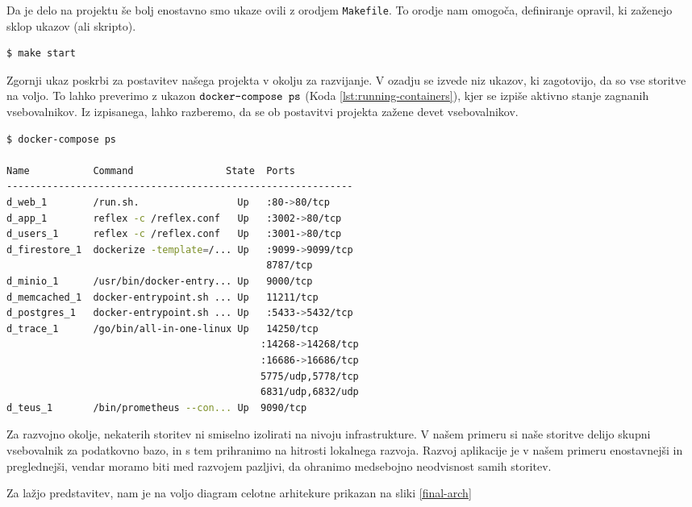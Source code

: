 \documentclass[a4paper, 12pt]{book}
\begin{document}
Da je delo na projektu še bolj enostavno smo ukaze ovili z orodjem \verb=Makefile=. To orodje nam omogoča, definiranje opravil, ki zaženejo sklop ukazov (ali skripto). 

\begin{lstlisting}[language=bash,style=mystyle]
$ make start
\end{lstlisting}

Zgornji ukaz poskrbi za postavitev našega projekta v okolju za razvijanje. V ozadju se izvede niz ukazov, ki zagotovijo, da so vse storitve na voljo. To lahko preverimo z ukazon $\verb=docker-compose ps=$ (Koda \ref{lst:running-containers}), kjer se izpiše aktivno stanje zagnanih vsebovalnikov. Iz izpisanega, lahko razberemo, da se ob postavitvi projekta zažene devet vsebovalnikov.  

\begin{lstlisting}[language=bash,style=mystyle,caption={Prikaz zagnanih vsebovalnikov},label=lst:running-containers]
$ docker-compose ps

Name           Command                State  Ports
------------------------------------------------------------
d_web_1        /run.sh.                 Up   :80->80/tcp
d_app_1        reflex -c /reflex.conf   Up   :3002->80/tcp
d_users_1      reflex -c /reflex.conf   Up   :3001->80/tcp 
d_firestore_1  dockerize -template=/... Up   :9099->9099/tcp             
                                             8787/tcp
d_minio_1      /usr/bin/docker-entry... Up   9000/tcp     
d_memcached_1  docker-entrypoint.sh ... Up   11211/tcp     
d_postgres_1   docker-entrypoint.sh ... Up   :5433->5432/tcp       
d_trace_1      /go/bin/all-in-one-linux Up   14250/tcp 
                                            :14268->14268/tcp
                                            :16686->16686/tcp
                                            5775/udp,5778/tcp 
                                            6831/udp,6832/udp   
d_teus_1       /bin/prometheus --con... Up  9090/tcp     
\end{lstlisting}

Za razvojno okolje, nekaterih storitev ni smiselno izolirati na nivoju infrastrukture. V našem primeru si naše storitve delijo skupni vsebovalnik za podatkovno bazo, in s tem prihranimo na hitrosti lokalnega razvoja. Razvoj aplikacije je v našem primeru enostavnejši in preglednejši, vendar moramo biti med razvojem pazljivi, da ohranimo medsebojno neodvisnost samih storitev. 

Za lažjo predstavitev, nam je na voljo diagram celotne arhitekure prikazan na sliki \ref{final-arch}
\end{document}

